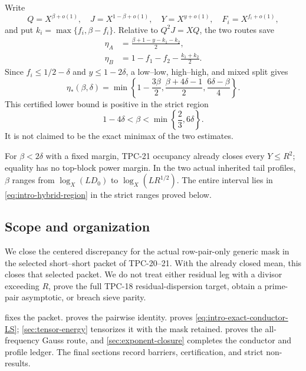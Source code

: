 Write
\[
 Q=X^{\beta+o(1)},\quad J=X^{1-\beta+o(1)},\quad
 Y=X^{y+o(1)},\quad F_i=X^{f_i+o(1)},
\]
and put \(k_i=\max\{f_i,\beta-f_i\}\).  Relative to
\(Q^2J=XQ\), the two routes save
\begin{align}
 \eta_A&=\frac{\beta+1-y-k_1-k_2}{2},
 \label{eq:intro-eta-A}\\
 \eta_B&=1-f_1-f_2-\frac{k_1+k_2}{2}.
 \label{eq:intro-eta-B}
\end{align}
Since \(f_i\le1/2-\delta\) and \(y\le1-2\delta\), a low--low,
high--high, and mixed split gives
\begin{equation}
 \eta_*(\beta,\delta)
 =\min\left\{
  1-\frac{3\beta}{2},
  \frac{\beta+4\delta-1}{2},
  \frac{6\delta-\beta}{4}
 \right\}.
 \label{eq:intro-eta-star}
\end{equation}
This certified lower bound is positive in the strict region
\begin{equation}
 1-4\delta<\beta<\min\left\{\frac23,6\delta\right\}.
 \label{eq:intro-hybrid-region}
\end{equation}
It is not claimed to be the exact minimax of the two estimates.

For \(\beta<2\delta\) with a fixed margin, TPC-21 occupancy already
closes every \(Y\le R^2\); equality has no top-block power margin.  In
the two actual inherited tail profiles, \(\beta\) ranges from
\(\log_X(LD_0)\) to \(\log_X(LR^{1/2})\).  The entire interval lies in
\eqref{eq:intro-hybrid-region} in the strict ranges proved below.

\subsection{Scope and organization}

We close the centered discrepancy for the actual row-pair-only generic
mask in the selected short--short packet of TPC-20--21.  With the
already closed mean, this closes that selected packet.  We do not treat
either residual leg with a divisor exceeding \(R\), prove the full
TPC-18 residual-dispersion target, obtain a prime-pair asymptotic, or
breach sieve parity.

 fixes the packet.  
proves the pairwise identity.   proves
\eqref{eq:intro-exact-conductor-LS}; \cref{sec:tensor-energy} tensorizes
it with the mask retained.   proves the
all-frequency Gauss route, and \cref{sec:exponent-closure} completes the
conductor and profile ledger.  The final sections record barriers,
certification, and strict non-results.
